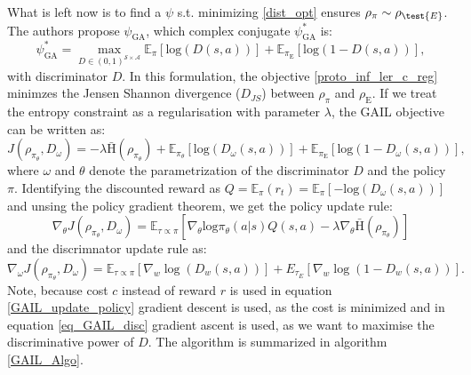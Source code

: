 What is left now is to find a $\psi$ s.t. minimizing \ref{dist_opt} ensures $\rho_{\pi} \sim \rho_{\test{E}}$. The authors propose $\psi_{\text{GA}}$, 
which complex conjugate $\psi^*_{\text{GA}}$ is: 
\begin{equation}
    \psi^*_{\text{GA}} = \max_{D\in(0,1)^{\mathcal{S} \times \mathcal{A}}} \mathbb{E}_{\pi}\left[ \text{log}(D(s,a))\right] + \mathbb{E}_{\pi_{\text{E}}}\left[ \text{log}(1 - D(s,a))\right],
\end{equation}
with discriminator $D$. In this formulation, the objective \ref{proto_inf_ler_c_reg} minimzes the Jensen Shannon divergence ($D_{JS}$) between $\rho_\pi$ and $\rho_{\text{E}}$. If we treat the entropy constraint as a regularisation with 
parameter $\lambda$, the GAIL objective can be written as:
\begin{equation}
    J(\rho_{\pi_{\theta}}, D_{\omega}) = - \lambda  \bar{\text{H}}(\rho_{\pi_{\theta}} ) + \mathbb{E}_{\pi_{\theta}}\left[ \text{log}(D_{\omega}(s,a))\right] + \mathbb{E}_{\pi_{\text{E}}}\left[ \text{log}(1 - D_{\omega}(s,a))\right],
\end{equation}
where $\omega$ and $\theta$ denote the parametrization of the discriminator $D$ and the policy $\pi$. Identifying the discounted reward as $Q = \mathbb{E}_{\pi}(r_t) = \mathbb{E}_{\pi}\left[-\text{log}(D_{\omega}(s,a))\right]$ and unsing the policy 
gradient theorem, we get the policy update rule:
\begin{equation}
    \label{GAIL_update_policy}
    \nabla_{\theta} J(\rho_{\pi_{\theta}}, D_{\omega}) = \mathbb{E}_{\tau \propto \pi}\left[ \nabla_{\theta}\text{log}\pi_{\theta}(a|s) Q(s,a) -\lambda \nabla_{\theta}\bar{\text{H}}(\rho_{\pi_{\theta}} )  \right]
\end{equation}
and the discrimnator update rule as:
\begin{equation}
    \label{eq_GAIL_disc}
    \nabla_{\omega} J(\rho_{\pi_{\theta}}, D_{\omega}) = \mathbb{E}_{\tau \propto \pi} [\nabla_w \log(D_w(s,a))] + {E}_{\tau_E} [\nabla_w \log(1 - D_w(s,a))].
\end{equation}
Note, because cost $c$ instead of reward $r$ is used in equation \ref{GAIL_update_policy} gradient descent is used, as the cost is minimized and in equation \ref{eq_GAIL_disc} 
gradient ascent is used, as we want to maximise the discriminative power of $D$. The algorithm is summarized in algorithm \ref{GAIL_Algo}.\\ \\
